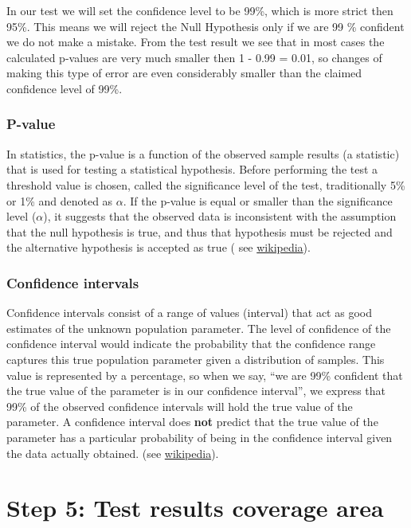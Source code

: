 \documentclass[]{article}
\begin{document}
In our test we will set the confidence level to be 99\%, which is more
strict then 95\%. This means we will reject the Null Hypothesis only if
we are 99 \% confident we do not make a mistake. From the test result we
see that in most cases the calculated p-values are very much smaller
then 1 - 0.99 = 0.01, so changes of making this type of error are even
considerably smaller than the claimed confidence level of 99\%.

\subsubsection{P-value}\label{p-value}

In statistics, the p-value is a function of the observed sample results
(a statistic) that is used for testing a statistical hypothesis. Before
performing the test a threshold value is chosen, called the significance
level of the test, traditionally 5\% or 1\% and denoted as \(\alpha\).
If the p-value is equal or smaller than the significance level
(\(\alpha\)), it suggests that the observed data is inconsistent with
the assumption that the null hypothesis is true, and thus that
hypothesis must be rejected and the alternative hypothesis is accepted
as true ( see \href{https://en.wikipedia.org/wiki/P-value}{wikipedia}).

\subsubsection{Confidence intervals}\label{confidence-intervals}

Confidence intervals consist of a range of values (interval) that act as
good estimates of the unknown population parameter. The level of
confidence of the confidence interval would indicate the probability
that the confidence range captures this true population parameter given
a distribution of samples. This value is represented by a percentage, so
when we say, ``we are 99\% confident that the true value of the
parameter is in our confidence interval'', we express that 99\% of the
observed confidence intervals will hold the true value of the parameter.
A confidence interval does \textbf{not} predict that the true value of
the parameter has a particular probability of being in the confidence
interval given the data actually obtained. (see
\href{https://en.wikipedia.org/wiki/Confidence_interval}{wikipedia}).

\newpage

\section{Step 5: Test results coverage
area}\label{step-5-test-results-coverage-area}
\end{document}
